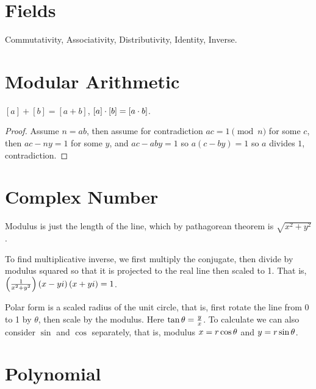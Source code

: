 \documentclass[11pt, cyan, night, 1in]{LatexTemplate/hw}
\begin{document}

\section{Fields}

Commutativity, Associativity, Distributivity, Identity, Inverse.

\section{Modular Arithmetic}

$[a]+[b]=[a+b]$, $[a]\cdot[b]=[a\cdot b]$.


\begin{proof}
    Assume $n=ab$, then assume for contradiction $ac=1 \pmod n$ for some $c$, then $ac-ny=1$ for some $y$, and $ac-aby=1$ so $a(c-by)=1$ so $a$ divides $1$, contradiction.
\end{proof}



\section{Complex Number}

Modulus is just the length of the line, which by pathagorean theorem is $\sqrt{x^2+y^2}$.

To find multiplicative inverse, we first multiply the conjugate, then divide by modulus squared so that it is projected to the real line then scaled to 1. That is, $\left(\frac1{x^2+y^2}\right)\left(x-yi\right)\left(x+yi\right)=1$.

Polar form is a scaled radius of the unit circle, that is, first rotate the line from 0 to 1 by $\theta$, then scale by the modulus. Here $\tan\theta=\frac yx$. To calculate we can also consider $\sin$ and $\cos$ separately, that is, modulus $x=r\cos\theta$ and $y=r\sin\theta$.

\section{Polynomial}
\end{document}
